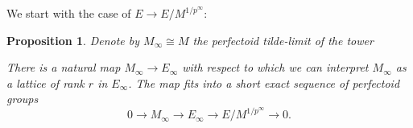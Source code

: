 \documentclass[10pt,oneside]{amsart}
\newtheorem{proposition}[theorem]{Proposition}
\theoremstyle{definition}
\theoremstyle{remark}
\begin{document}
	We start with the case of $E\rightarrow E/M^{1/p^\infty}$:
	\begin{proposition}\label{the morphism E->E/M^{1/p^n} in the limit}
		Denote by $M_\infty\cong M$ the perfectoid tilde-limit of the tower
		\begin{center}
		\end{center}
		There is a natural map $M_\infty \rightarrow E_\infty$ with respect to which we can interpret $M_\infty$ as a lattice of rank $r$ in $E_\infty$. The map fits into a short exact sequence of perfectoid groups
		\[0\rightarrow M_\infty\rightarrow E_\infty \rightarrow E/M^{1/p^\infty} \rightarrow 0.\]
	\end{proposition}
\end{document}
